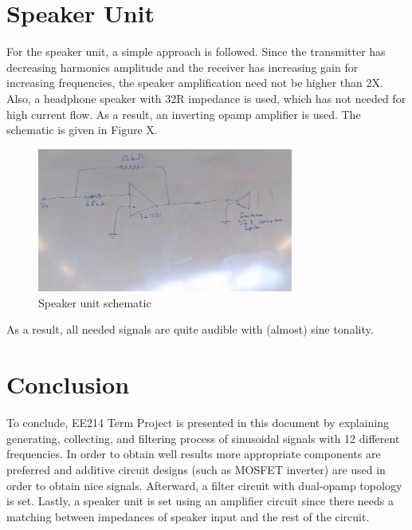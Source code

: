 \documentclass[letterpaper,12pt]{article}
\begin{document}
\section{Speaker Unit}
For the speaker unit, a simple approach is followed. Since the transmitter has decreasing harmonics amplitude and the receiver has increasing gain for increasing frequencies, the speaker amplification need not be higher than 2X. Also, a headphone speaker with 32R impedance is used, which has not needed for high current flow. As a result, an inverting opamp amplifier is used. The schematic is given in Figure X.
\begin{figure}[H]
    \centering
    \includegraphics[width = 0.75\textwidth]{speaker_schematic.jpg}
    \caption{Speaker unit schematic}
\end{figure}

As a result, all needed signals are quite audible with (almost) sine tonality. 

\section{Conclusion}
To conclude, EE214 Term Project is presented in this document by explaining generating, collecting, and filtering process of sinusoidal signals with 12 different frequencies. In order to obtain well results more appropriate components are preferred and additive circuit designs (such as MOSFET inverter) are used in order to obtain nice signals. Afterward, a filter circuit with dual-opamp topology is set. Lastly, a speaker unit is set using an amplifier circuit since there needs a matching between impedances of speaker input and the rest of the circuit.    
\end{document}
